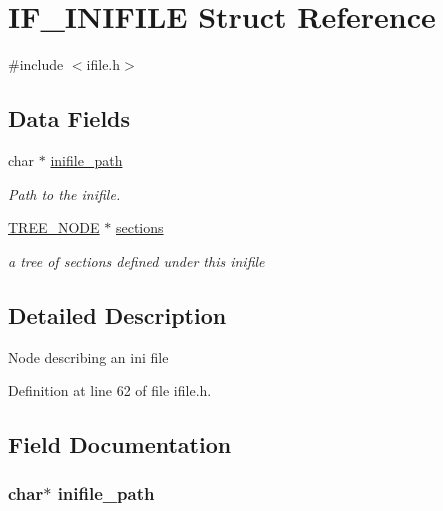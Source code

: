 \hypertarget{struct_i_f___i_n_i_f_i_l_e}{\section{I\-F\-\_\-\-I\-N\-I\-F\-I\-L\-E Struct Reference}
\label{struct_i_f___i_n_i_f_i_l_e}
}


{\ttfamily \#include $<$ifile.\-h$>$}

\subsection*{Data Fields}
\begin{DoxyCompactItemize}
\item 
char $\ast$ \hyperlink{struct_i_f___i_n_i_f_i_l_e_a7644552044e2af0e412f97778d1a7931}{inifile\-\_\-path}
\begin{DoxyCompactList}\small\item\em Path to the inifile. \end{DoxyCompactList}\item 
\hyperlink{btacc_8h_a401cf184fc63368a8957143cbb772739}{T\-R\-E\-E\-\_\-\-N\-O\-D\-E} $\ast$ \hyperlink{struct_i_f___i_n_i_f_i_l_e_a01635bfe6be6a3bc8200031a3ab1d33d}{sections}
\begin{DoxyCompactList}\small\item\em a tree of sections defined under this inifile \end{DoxyCompactList}\end{DoxyCompactItemize}


\subsection{Detailed Description}
Node describing an ini file 

Definition at line 62 of file ifile.\-h.



\subsection{Field Documentation}
\hypertarget{struct_i_f___i_n_i_f_i_l_e_a7644552044e2af0e412f97778d1a7931}{
\subsubsection[{inifile\-\_\-path}]{\setlength{\rightskip}{0pt plus 5cm}char$\ast$ inifile\-\_\-path}}\label{struct_i_f___i_n_i_f_i_l_e_a7644552044e2af0e412f97778d1a7931}


